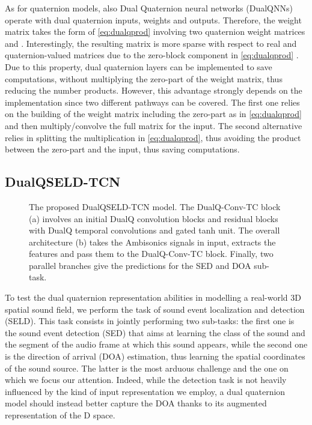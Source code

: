 \documentclass[3p, preprint, twocolumn]{elsarticle}
\begin{document}
As for quaternion models, also Dual Quaternion neural networks (DualQNNs) operate with dual quaternion inputs, weights and outputs. Therefore, the weight matrix  takes the form of \eqref{eq:dualqprod} involving two quaternion weight matrices  and . Interestingly, the resulting matrix is more sparse with respect to real and quaternion-valued matrices due to the zero-block component in \eqref{eq:dualqprod} \cite{Schwung2021RigidBody}. Due to this property, dual quaternion layers can be implemented to save computations, without multiplying the zero-part of the weight matrix, thus reducing the number products. However, this advantage strongly depends on the implementation since two different pathways can be covered. The first one relies on the building of the weight matrix including the zero-part as in \eqref{eq:dualqprod} and then multiply/convolve the full matrix for the input. The second alternative relies in splitting the multiplication in \eqref{eq:dualqprod}, thus avoiding the product between the zero-part and the input, thus saving computations.

\subsection{DualQSELD-TCN}

\begin{figure*}[t]
\centering
{} 
\quad
{}
\quad
{}
\caption{The proposed DualQSELD-TCN model. The DualQ-Conv-TC block (a) involves an initial DualQ convolution blocks and  residual blocks with DualQ temporal convolutions and gated tanh unit. The overall architecture (b) takes the Ambisonics signals in input, extracts the features and pass them to the DualQ-Conv-TC block. Finally, two parallel branches give the predictions for the SED and DOA sub-task.}
\label{fig:arch}
\end{figure*}

To test the dual quaternion representation abilities in modelling a real-world 3D spatial sound field, we perform the task of sound event localization and detection (SELD). This task consists in jointly performing two sub-tasks: the first one is the sound event detection (SED) that aims at learning the class of the sound and the segment of the audio frame at which this sound appears, while the second one is the direction of arrival (DOA) estimation, thus learning the spatial coordinates of the sound source. The latter is the most arduous challenge and the one on which we focus our attention. Indeed, while the detection task is not heavily influenced by the kind of input representation we employ, a dual quaternion model should instead better capture the DOA thanks to its augmented representation of the D space.
\end{document}
